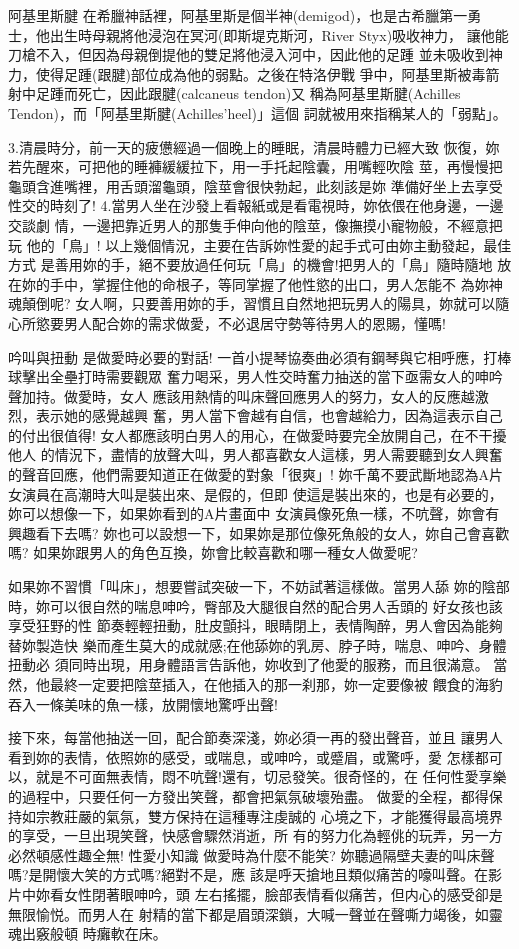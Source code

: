 \documentclass[12pt,UTF8]{ctexbook}
\begin{document}
阿基里斯腱
在希臘神話裡，阿基里斯是個半神(demigod)，也是古希臘第一勇
士，他出生時母親將他浸泡在冥河(即斯堤克斯河，River Styx)吸收神力，
讓他能刀槍不入，但因為母親倒提他的雙足將他浸入河中，因此他的足踵
並未吸收到神力，使得足踵(跟腱)部位成為他的弱點。之後在特洛伊戰
爭中，阿基里斯被毒箭射中足踵而死亡，因此跟腱(calcaneus tendon)又
稱為阿基里斯腱(Achilles Tendon)，而「阿基里斯腱(Achilles'heel)」這個
詞就被用來指稱某人的「弱點」。

3.清晨時分，前一天的疲憊經過一個晚上的睡眠，清晨時體力已經大致
恢復，妳若先醒來，可把他的睡褲緩緩拉下，用一手托起陰囊，用嘴輕吹陰
莖，再慢慢把龜頭含進嘴裡，用舌頭溜龜頭，陰莖會很快勃起，此刻該是妳
準備好坐上去享受性交的時刻了!
4.當男人坐在沙發上看報紙或是看電視時，妳依偎在他身邊，一邊交談劇
情，一邊把靠近男人的那隻手伸向他的陰莖，像撫摸小寵物般，不經意把玩
他的「鳥」!
以上幾個情況，主要在告訴妳性愛的起手式可由妳主動發起，最佳方式
是善用妳的手，絕不要放過任何玩「鳥」的機會!把男人的「鳥」隨時隨地
放在妳的手中，掌握住他的命根子，等同掌握了他性慾的出口，男人怎能不
為妳神魂顛倒呢?
女人啊，只要善用妳的手，習慣且自然地把玩男人的陽具，妳就可以隨
心所慾要男人配合妳的需求做愛，不必退居守勢等待男人的恩賜，懂嗎!

吟叫與扭動
是做愛時必要的對話!
一首小提琴協奏曲必須有鋼琴與它相呼應，打棒球擊出全壘打時需要觀眾
奮力喝采，男人性交時奮力抽送的當下亟需女人的呻吟聲加持。做愛時，女人
應該用熱情的叫床聲回應男人的努力，女人的反應越激烈，表示她的感覺越興
奮，男人當下會越有自信，也會越給力，因為這表示自己的付出很值得!
女人都應該明白男人的用心，在做愛時要完全放開自己，在不干擾他人
的情況下，盡情的放聲大叫，男人都喜歡女人這樣，男人需要聽到女人興奮
的聲音回應，他們需要知道正在做愛的對象「很爽」!
妳千萬不要武斷地認為A片女演員在高潮時大叫是裝出來、是假的，但即
使這是裝出來的，也是有必要的，妳可以想像一下，如果妳看到的A片畫面中
女演員像死魚一樣，不吭聲，妳會有興趣看下去嗎?
妳也可以設想一下，如果妳是那位像死魚般的女人，妳自己會喜歡嗎?
如果妳跟男人的角色互換，妳會比較喜歡和哪一種女人做愛呢?

如果妳不習慣「叫床」，想要嘗試突破一下，不妨試著這樣做。當男人舔
妳的陰部時，妳可以很自然的喘息呻吟，臀部及大腿很自然的配合男人舌頭的
好女孩也該享受狂野的性
節奏輕輕扭動，肚皮顫抖，眼睛閉上，表情陶醉，男人會因為能夠替妳製造快
樂而產生莫大的成就感;在他舔妳的乳房、脖子時，喘息、呻吟、身體扭動必
須同時出現，用身體語言告訴他，妳收到了他愛的服務，而且很滿意。
當然，他最終一定要把陰莖插入，在他插入的那一刹那，妳一定要像被
餵食的海豹吞入一條美味的魚一樣，放開懷地驚呼出聲!

接下來，每當他抽送一回，配合節奏深淺，妳必須一再的發出聲音，並且
讓男人看到妳的表情，依照妳的感受，或喘息，或呻吟，或蹙眉，或驚呼，愛
怎樣都可以，就是不可面無表情，悶不吭聲!還有，切忌發笑。很奇怪的，在
任何性愛享樂的過程中，只要任何一方發出笑聲，都會把氣氛破壞殆盡。
做愛的全程，都得保持如宗教莊嚴的氣氛，雙方保持在這種專注虔誠的
心境之下，才能獲得最高境界的享受，一旦出現笑聲，快感會驟然消逝，所
有的努力化為輕佻的玩弄，另一方必然頓感性趣全無!
性愛小知識
做愛時為什麼不能笑?
妳聽過隔壁夫妻的叫床聲嗎?是開懷大笑的方式嗎?絕對不是，應
該是呼天搶地且類似痛苦的嚎叫聲。在影片中妳看女性閉著眼呻吟，頭
左右搖擺，臉部表情看似痛苦，但内心的感受卻是無限愉悦。而男人在
射精的當下都是眉頭深鎖，大喊一聲並在聲嘶力竭後，如靈魂出竅般頓
時癱軟在床。
\end{document}
